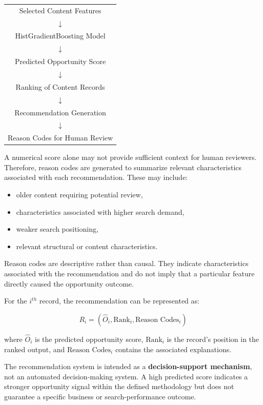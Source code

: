 \documentclass[12pt,a4paper]{report}
\begin{document}
\begin{center}
\begin{tabular}{c}
Selected Content Features \\
$\downarrow$ \\
HistGradientBoosting Model \\
$\downarrow$ \\
Predicted Opportunity Score \\
$\downarrow$ \\
Ranking of Content Records \\
$\downarrow$ \\
Recommendation Generation \\
$\downarrow$ \\
Reason Codes for Human Review
\end{tabular}
\end{center}

A numerical score alone may not provide sufficient context for human reviewers. Therefore, reason codes are generated to summarize relevant characteristics associated with each recommendation. These may include:

\begin{itemize}
    \item older content requiring potential review,
    \item characteristics associated with higher search demand,
    \item weaker search positioning,
    \item relevant structural or content characteristics.
\end{itemize}

Reason codes are descriptive rather than causal. They indicate characteristics associated with the recommendation and do not imply that a particular feature directly caused the opportunity outcome.

For the $i^{th}$ record, the recommendation can be represented as:

\begin{equation}
R_i =
\left(
\hat{O}_i,
\text{Rank}_i,
\text{Reason Codes}_i
\right)
\end{equation}

where $\hat{O}_i$ is the predicted opportunity score, $\text{Rank}_i$ is the record's position in the ranked output, and $\text{Reason Codes}_i$ contains the associated explanations.

The recommendation system is intended as a \textbf{decision-support mechanism}, not an automated decision-making system. A high predicted score indicates a stronger opportunity signal within the defined methodology but does not guarantee a specific business or search-performance outcome.
\end{document}
